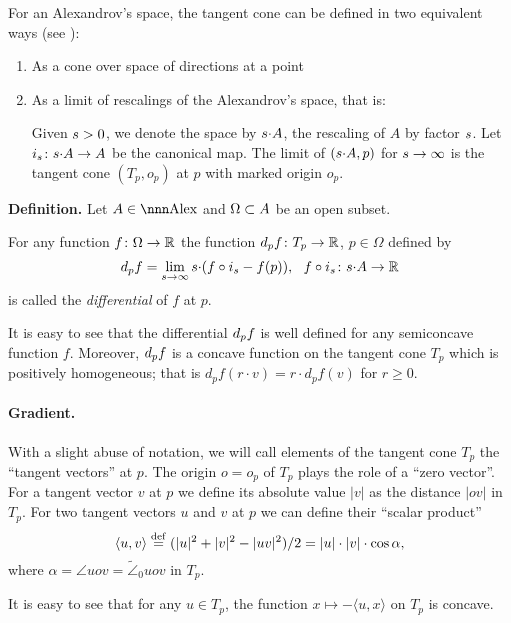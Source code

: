 \documentclass{article}
\begin{document}
For an Alexandrov's space, the tangent cone can be defined in two equivalent ways (see \cite[7.8.1]{BGP}):
\begin{enumerate}[$\diamond$]
\item As a cone over space of directions at a point
\item \label{tangent-def2}
As a limit of rescalings of the Alexandrov's space, that is:

Given $s>0$, we denote the space by $s{\cdot} A$, the rescaling of $A$ by factor $s$.
Let $i_s\colon s{\cdot} A\to A$ be the canonical map. 
The limit of $(s{\cdot} A,p)$ for $s\to\infty$ is  the tangent cone $(T_p,o_p)$ at $p$ with marked origin $o_p$. 

\end{enumerate}



\begin{thm}{\bf Definition.}\label{def:df} Let $A\in\Alex$ and $\Omega\subset A$ be an open subset.

For any function $f\colon\Omega \rightarrow \mathbb{R}$ the function $d_p f\colon T_p \rightarrow \mathbb{R}$, $p\in\Omega$ defined by
$$d_p f=\lim_{s\to\infty} s{\cdot}(f\circ i_s-f(p)), \ \ f\circ i_s\colon s{\cdot} A\to\mathbb{R}$$
is called the \emph{differential} of $f$ at $p$.
\end{thm}

It is easy to see that the differential $d_p f$ is well defined for any semiconcave function $f$. 
Moreover, $d_p f$
is a concave function on the tangent cone $T_p$ which is positively homogeneous; 
that is
$d_p f(r\cdot v)=r\cdot d_p f(v)$
for $r\ge0$.

\paragraph*{Gradient.} With a slight abuse of notation, we will call elements of the tangent cone $T_p$ the ``tangent vectors'' at $p$.
The origin $o=o_p$ of $T_p$ plays the role of a ``zero 
vector''.
For a tangent vector $v$ at $p$ we define its absolute value $|v|$ 
as the distance $|o v|$ in $T_p$.
For two tangent vectors $u$ and $v$ at $p$ we can define 
their ``scalar product'' 
$$\langle u, v\rangle\df
=
(|u|^2+|v|^2-|u v|^2)/2
=
|u|\cdot |v|\cdot\cos\alpha,$$ 
where $\alpha=\angle u o v=\tilde\angle_0 u o v$ in $T_p$.

 It is easy to see that for any $u\in T_p$, the function $x\mapsto -\langle u, x\rangle$ on $T_p$ is concave.
\end{document}
